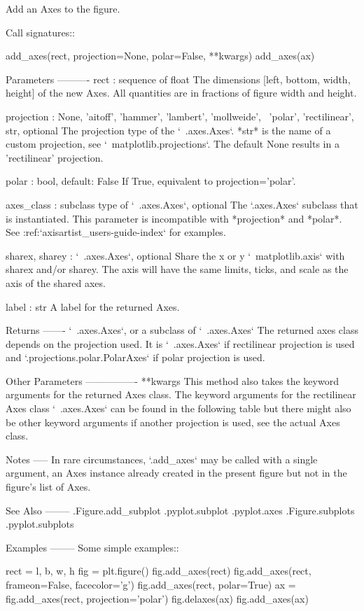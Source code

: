 \begin{DoxyVerb}Add an Axes to the figure.

Call signatures::

    add_axes(rect, projection=None, polar=False, **kwargs)
    add_axes(ax)

Parameters
----------
rect : sequence of float
    The dimensions [left, bottom, width, height] of the new Axes. All
    quantities are in fractions of figure width and height.

projection : {None, 'aitoff', 'hammer', 'lambert', 'mollweide', \
'polar', 'rectilinear', str}, optional
    The projection type of the `~.axes.Axes`. *str* is the name of
    a custom projection, see `~matplotlib.projections`. The default
    None results in a 'rectilinear' projection.

polar : bool, default: False
    If True, equivalent to projection='polar'.

axes_class : subclass type of `~.axes.Axes`, optional
    The `.axes.Axes` subclass that is instantiated.  This parameter
    is incompatible with *projection* and *polar*.  See
    :ref:`axisartist_users-guide-index` for examples.

sharex, sharey : `~.axes.Axes`, optional
    Share the x or y `~matplotlib.axis` with sharex and/or sharey.
    The axis will have the same limits, ticks, and scale as the axis
    of the shared axes.

label : str
    A label for the returned Axes.

Returns
-------
`~.axes.Axes`, or a subclass of `~.axes.Axes`
    The returned axes class depends on the projection used. It is
    `~.axes.Axes` if rectilinear projection is used and
    `.projections.polar.PolarAxes` if polar projection is used.

Other Parameters
----------------
**kwargs
    This method also takes the keyword arguments for
    the returned Axes class. The keyword arguments for the
    rectilinear Axes class `~.axes.Axes` can be found in
    the following table but there might also be other keyword
    arguments if another projection is used, see the actual Axes
    class.


Notes
-----
In rare circumstances, `.add_axes` may be called with a single
argument, an Axes instance already created in the present figure but
not in the figure's list of Axes.

See Also
--------
.Figure.add_subplot
.pyplot.subplot
.pyplot.axes
.Figure.subplots
.pyplot.subplots

Examples
--------
Some simple examples::

    rect = l, b, w, h
    fig = plt.figure()
    fig.add_axes(rect)
    fig.add_axes(rect, frameon=False, facecolor='g')
    fig.add_axes(rect, polar=True)
    ax = fig.add_axes(rect, projection='polar')
    fig.delaxes(ax)
    fig.add_axes(ax)
\end{DoxyVerb}

